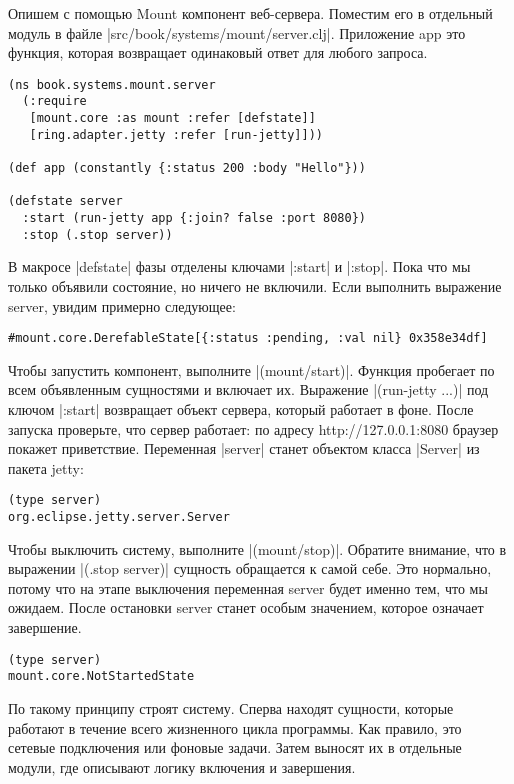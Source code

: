 Опишем с помощью Mount компонент веб-сервера. Поместим его в отдельный модуль в
файле \spverb|src/book/systems/mount/server.clj|. Приложение app это функция, которая
возвращает одинаковый ответ для любого запроса.

\begin{verbatim}
(ns book.systems.mount.server
  (:require
   [mount.core :as mount :refer [defstate]]
   [ring.adapter.jetty :refer [run-jetty]]))

(def app (constantly {:status 200 :body "Hello"}))

(defstate server
  :start (run-jetty app {:join? false :port 8080})
  :stop (.stop server))
\end{verbatim}

В макросе \spverb|defstate| фазы отделены ключами \spverb|:start| и \spverb|:stop|. Пока что мы
только объявили состояние, но ничего не включили. Если выполнить выражение
server, увидим примерно следующее:

\begin{verbatim}
#mount.core.DerefableState[{:status :pending, :val nil} 0x358e34df]
\end{verbatim}

Чтобы запустить компонент, выполните \spverb|(mount/start)|. Функция пробегает по всем
объявленным сущностями и включает их. Выражение \spverb|(run-jetty ...)| под ключом
\spverb|:start| возвращает объект сервера, который работает в фоне. После запуска
проверьте, что сервер работает: по адресу http://127.0.0.1:8080 браузер покажет
приветствие. Переменная \spverb|server| станет объектом класса \spverb|Server| из пакета
jetty:

\begin{verbatim}
(type server)
org.eclipse.jetty.server.Server
\end{verbatim}

Чтобы выключить систему, выполните \spverb|(mount/stop)|. Обратите внимание, что в
выражении \spverb|(.stop server)| сущность обращается к самой себе. Это нормально,
потому что на этапе выключения переменная server будет именно тем, что мы
ожидаем. После остановки server станет особым значением, которое означает
завершение.

\begin{verbatim}
(type server)
mount.core.NotStartedState
\end{verbatim}

По такому принципу строят систему. Сперва находят сущности, которые работают в
течение всего жизненного цикла программы. Как правило, это сетевые подключения
или фоновые задачи. Затем выносят их в отдельные модули, где описывают логику
включения и завершения.

